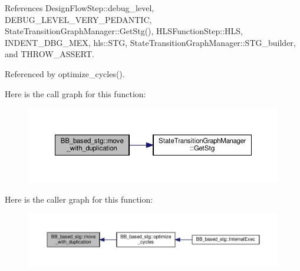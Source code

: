 References Design\+Flow\+Step\+::debug\+\_\+level, D\+E\+B\+U\+G\+\_\+\+L\+E\+V\+E\+L\+\_\+\+V\+E\+R\+Y\+\_\+\+P\+E\+D\+A\+N\+T\+IC, State\+Transition\+Graph\+Manager\+::\+Get\+Stg(), H\+L\+S\+Function\+Step\+::\+H\+LS, I\+N\+D\+E\+N\+T\+\_\+\+D\+B\+G\+\_\+\+M\+EX, hls\+::\+S\+TG, State\+Transition\+Graph\+Manager\+::\+S\+T\+G\+\_\+builder, and T\+H\+R\+O\+W\+\_\+\+A\+S\+S\+E\+RT.



Referenced by optimize\+\_\+cycles().

Here is the call graph for this function\+:
\nopagebreak
\begin{figure}[H]
\begin{center}
\leavevmode
\includegraphics[width=350pt]{dd/d84/classBB__based__stg_a9cb34c2e58d4fee4571e3b90181d3049_cgraph}
\end{center}
\end{figure}
Here is the caller graph for this function\+:
\nopagebreak
\begin{figure}[H]
\begin{center}
\leavevmode
\includegraphics[width=350pt]{dd/d84/classBB__based__stg_a9cb34c2e58d4fee4571e3b90181d3049_icgraph}
\end{center}
\end{figure}
\mbox{\label{classBB__based__stg_aecadba799040dd72068eb6805f7f53e2}} 
